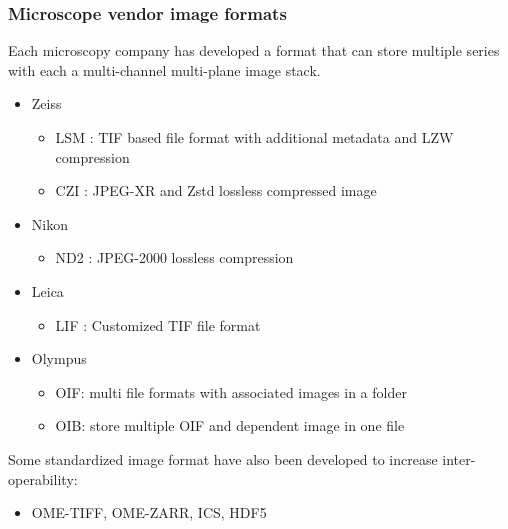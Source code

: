 \documentclass[ignorenonframetext,aspectratio=169,10pt,xcolor=table]{beamer}
\begin{document}
\begin{frame} \frametitle{Microscope vendor image formats} Each
  microscopy company has developed a format that can store multiple
  series with each a multi-channel multi-plane image stack.
  \begin{itemize}
  \item Zeiss
    \begin{itemize}
    \item LSM : TIF based file format with additional metadata and LZW
      compression
    \item CZI : JPEG-XR and Zstd lossless compressed image
    \end{itemize}
  \item Nikon
    \begin{itemize}
    \item ND2 : JPEG-2000 lossless compression
    \end{itemize}
  \item Leica
    \begin{itemize}
    \item LIF : Customized TIF file format
    \end{itemize}
  \item Olympus
    \begin{itemize}
    \item OIF: multi file formats with associated images in a folder
    \item OIB: store multiple OIF and dependent image in one file
    \end{itemize}
  \end{itemize} Some standardized image format have also been
  developed to increase inter-operability:
  \begin{itemize}
  \item OME-TIFF, OME-ZARR, ICS, HDF5
  \end{itemize}

\end{frame}
\end{document}
